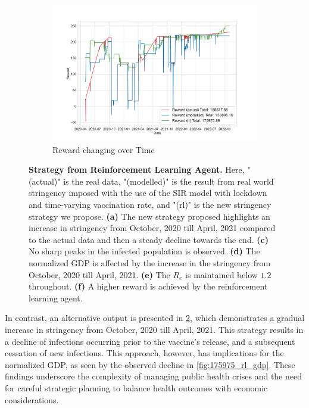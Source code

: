 \documentclass[tikz,fleqn,12pt]{wlscirep}
\begin{document}
\begin{figure}[htbp!]
\begin{subfigure}[t]{0.48\textwidth}
    \includegraphics[width=\linewidth]{images/175975/rl_reward.pdf}
    \caption{Reward changing over Time}
    \label{fig:175975_rl_reward}
  \end{subfigure}
  \caption{\textbf{Strategy from Reinforcement Learning Agent.} Here, "(actual)" is the real data, "(modelled)" is the result from real world stringency imposed with the use of the SIR model with lockdown and time-varying vaccination rate, and "(rl)" is the new stringency strategy we propose. \textbf{(a)} The new strategy proposed highlights an increase in stringency from October, 2020 till April, 2021 compared to the actual data and then a steady decline towards the end. \textbf{(c)} No sharp peaks in the infected population is observed. \textbf{(d)} The normalized GDP is affected by the increase in the stringency from October, 2020 till April, 2021. \textbf{(e)} The $R_e$ is maintained below $1.2$ throughout. \textbf{(f)} A higher reward is achieved by the reinforcement learning agent.}
  \label{fig:175975_parent}
\end{figure}

In contrast, an alternative output is presented in \cref{fig:175975_parent}, which demonstrates a gradual increase in stringency from October, 2020 till April, 2021. This strategy results in a decline of infections occurring prior to the vaccine's release, and a subsequent cessation of new infections. This approach, however, has implications for the normalized GDP, as seen by the observed decline in \cref{fig:175975_rl_gdp}. These findings underscore the complexity of managing public health crises and the need for careful strategic planning to balance health outcomes with economic considerations.
\end{document}
